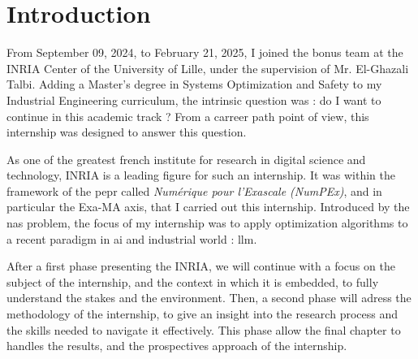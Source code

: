 \chapter*{Introduction}

From September 09, 2024, to February 21, 2025, I joined the \acrfull{bonus} team at the INRIA Center of the University of Lille, under the supervision of Mr. El-Ghazali Talbi. Adding a Master's degree in Systems Optimization and Safety to my Industrial Engineering curriculum, the intrinsic question was : do I want to continue in this academic track ? From a carreer path point of view, this internship was designed to answer this question.

As one of the greatest french institute for research in digital science and technology, INRIA is a leading figure for such an internship. It was within the framework of the \acrfull{pepr} called \textit{Numérique pour l'Exascale (NumPEx)}, and in particular the Exa-MA axis, that I carried out this internship. Introduced by the \acrfull{nas} problem, the focus of my internship was to apply optimization algorithms to a recent paradigm in \acrfull{ai} and industrial world : \acrfull{llm}.

After a first phase presenting the INRIA, we will continue with a focus on the subject of the internship, and the context in which it is embedded, to fully understand the stakes and the environment. Then, a second phase will adress the methodology of the internship, to give an insight into the research process and the skills needed to navigate it effectively. This phase allow the final chapter to handles the results, and the prospectives approach of the internship.

